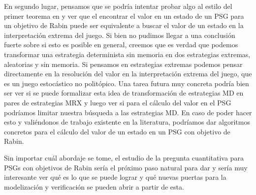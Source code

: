 En segundo lugar, pensamos que se podría intentar probar algo al estilo del
primer teorema en \cite{Polytopal} y ver que el encontrar el valor en un estado
de un PSG para un objetivo de Rabin puede ser equivalente a buscar el valor de
un estado en la interpretación extrema del juego. Si bien no pudimos llegar a
una conclusión fuerte sobre si esto es posible en general, creemos que es
verdad que podemos transformar una estrategia determinista sin memoria en dos
estrategias extremas, aleatorias y sin memoria. Si pensamos en estrategias
extremas podemos pensar directamente en la resolución del valor en la
interpretación extrema del juego, que es un juego estocástico no politópico.
Una tarea futura muy concreta podría bien ser ver si se puede formalizar esta
idea de transformación de estrategias MD en pares de estrategias MRX y luego
ver si para el cálculo del valor en el PSG podríamos limitar nuestra búsqueda a
las estrategias MD. En caso de poder hacer esto y valiéndonos de trabajo
existente en la literatura, podríamos dar algoritmos concretos para el cálculo
del valor de un estado en un PSG con objetivo de Rabin.

Sin importar cuál abordaje se tome, el estudio de la pregunta cuantitativa para
PSGs con objetivos de Rabin sería el próximo paso natural para dar y sería muy
interesante ver qué es lo que se puede lograr y qué nuevas puertas para la
modelización y verificación se pueden abrir a partir de esta.